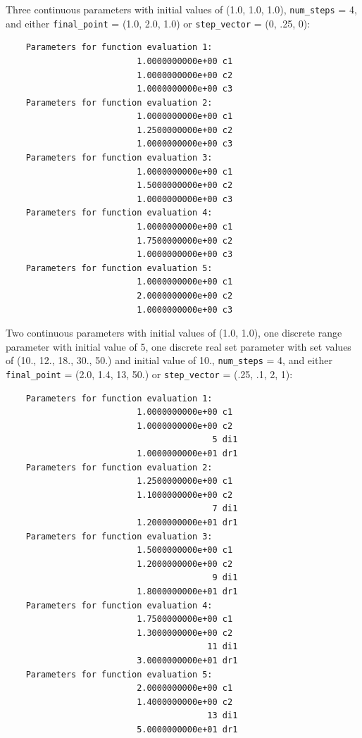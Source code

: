 Three continuous parameters with initial values of (1.0, 1.0, 1.0), 
\texttt{num\_steps} = 4, and either \texttt{final\_point} = 
(1.0, 2.0, 1.0) or \texttt{step\_vector} = (0, .25, 0):
\begin{small}
\begin{verbatim}
    Parameters for function evaluation 1:
                          1.0000000000e+00 c1   
                          1.0000000000e+00 c2   
                          1.0000000000e+00 c3   
    Parameters for function evaluation 2:
                          1.0000000000e+00 c1   
                          1.2500000000e+00 c2   
                          1.0000000000e+00 c3   
    Parameters for function evaluation 3:
                          1.0000000000e+00 c1   
                          1.5000000000e+00 c2   
                          1.0000000000e+00 c3   
    Parameters for function evaluation 4:
                          1.0000000000e+00 c1   
                          1.7500000000e+00 c2   
                          1.0000000000e+00 c3   
    Parameters for function evaluation 5:
                          1.0000000000e+00 c1   
                          2.0000000000e+00 c2   
                          1.0000000000e+00 c3   
\end{verbatim}
\end{small}

Two continuous parameters with initial values of (1.0, 1.0), one
discrete range parameter with initial value of 5, one discrete real
set parameter with set values of (10., 12., 18., 30., 50.) and initial
value of 10., \texttt{num\_steps} = 4, and either \texttt{final\_point}
= (2.0, 1.4, 13, 50.) or \texttt{step\_vector} = (.25, .1, 2, 1):
\begin{small}
\begin{verbatim}
    Parameters for function evaluation 1:
                          1.0000000000e+00 c1
                          1.0000000000e+00 c2
                                         5 di1
                          1.0000000000e+01 dr1
    Parameters for function evaluation 2:
                          1.2500000000e+00 c1   
                          1.1000000000e+00 c2   
                                         7 di1
                          1.2000000000e+01 dr1
    Parameters for function evaluation 3:
                          1.5000000000e+00 c1   
                          1.2000000000e+00 c2   
                                         9 di1
                          1.8000000000e+01 dr1
    Parameters for function evaluation 4:
                          1.7500000000e+00 c1   
                          1.3000000000e+00 c2   
                                        11 di1
                          3.0000000000e+01 dr1
    Parameters for function evaluation 5:
                          2.0000000000e+00 c1   
                          1.4000000000e+00 c2   
                                        13 di1
                          5.0000000000e+01 dr1
\end{verbatim}
\end{small}

